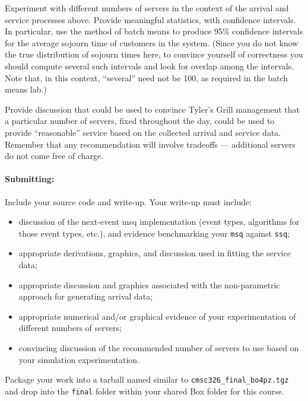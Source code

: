 \documentclass[11pt,addpoints,answers]{exam}
\begin{document}
\begin{questions}
  \question Experiment with different numbers of servers in the context of the
  arrival and service processes above.  Provide meaningful statistics, with
  confidence intervals.  In particular, use the method of batch means to
  produce 95\% confidence intervals for the average sojourn time of customers
  in the system.  (Since you do not know the true distribution of sojourn times
  here, to convince yourself of correctness you should compute several such
  intervals and look for overlap among the intervals.  Note that, in this
  context, ``several'' need not be 100, as required in the batch means lab.)
  \begin{solution}
  \end{solution}
  
  \question Provide discussion that could be used to convince Tyler's Grill
  management that a particular number of servers, fixed throughout the day,
  could be used to provide ``reasonable'' service based on the collected
  arrival and service data.
  Remember that any recommendation will involve tradeoffs --- additional
  servers do not come free of charge.
  \begin{solution}
  \end{solution}
\end{questions}

 \paragraph{Submitting:}
 Include your source code and write-up.
 Your write-up must include:
    \vspace*{-10pt}
    \begin{itemize}
      \setlength{\itemsep}{0pt}
      \item discussion of the next-event msq implementation (event types,
        algorithms for those event types, etc.), and
        evidence benchmarking your {\tt msq} against {\tt ssq};
      \item appropriate derivations, graphics, and discussion used in fitting
        the service data;  
      \item appropriate discussion and graphics associated with the
        non-parametric approach for generating arrival data;
      \item appropriate numerical and/or graphical evidence of your
        experimentation of different numbers of servers;
      \item convincing discussion of the recommended number of servers to use
        based on your simulation experimentation.
    \end{itemize}
    \vspace*{-10pt}
 Package your work into a tarball named similar to {\tt cmsc326\_final\_bo4pz.tgz} and
 drop into the {\tt final} folder within your shared Box folder for this course.
\end{document}
